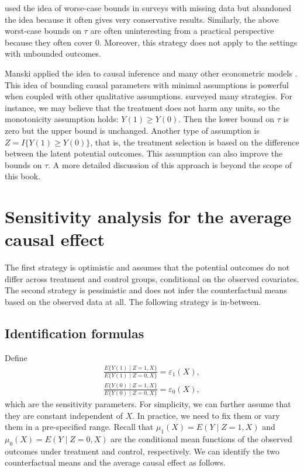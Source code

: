 \citet{cochran1953} used the idea of worse-case bounds in surveys with missing data but abandoned the idea because it often gives very conservative results. Similarly, the above worst-case bounds on $\tau$ are often uninteresting from a practical perspective because they often cover $0$.  Moreover, this strategy does not apply to the settings with unbounded outcomes. 



Manski applied the idea to causal inference \citep{manski1990nonparametric} and many other econometric models \citep{manski2003partial}. 
This idea of bounding causal parameters with minimal assumptions is powerful when coupled with other qualitative assumptions. \citet{manski2003partial} surveyed many strategies. 
For instance, we may believe that the treatment does not harm any units, so the monotonicity assumption holds:
$
Y(1)\geq Y(0) . 
$
Then the lower bound on $\tau$ is zero but the upper bound is unchanged. 
Another type of assumption is 
$Z = I\{  Y(1) \geq Y(0) \}$, that is, the treatment selection is based on the difference between the latent potential outcomes. This assumption can also improve the bounds on $\tau$. 
A more detailed discussion of this approach is beyond the scope of this book. 

 
 


 
\section{Sensitivity analysis for the average causal effect}


 
The first strategy is optimistic and assumes that the potential outcomes do not differ across treatment and control groups, conditional on the observed covariates. The second strategy is pessimistic and does not infer the counterfactual means based on the observed data at all. The following strategy is in-between. 



\subsection{Identification formulas}

Define
\begin{eqnarray*}
\frac{ E\{ Y(1)\mid Z=1, X \} }{ E\{ Y(1)\mid Z=0, X \} } = \varepsilon_1(X), \\
\frac{ E\{ Y(0)\mid Z=1, X \} }{ E\{ Y(0)\mid Z=0, X \} } = \varepsilon_0(X) ,
\end{eqnarray*}
which are the sensitivity parameters. For simplicity, we can further assume that they are constant independent of $X$. In practice, we need to fix them or vary them in a pre-specified range. Recall that $\mu_1(X) = E(Y\mid Z=1, X)$ and $\mu_0(X) = E(Y\mid Z=0, X)$ are the conditional mean functions of the observed outcomes under treatment and control, respectively. We can identify the two counterfactual means and the average causal effect as follows. 

